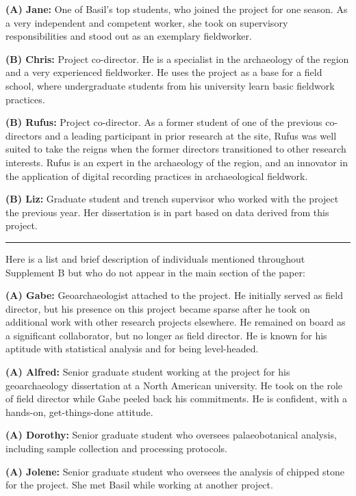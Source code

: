 \documentclass[
]{article}
\begin{document}
\textbf{(A) Jane:} One of Basil's top students, who joined the project
for one season. As a very independent and competent worker, she took on
supervisory responsibilities and stood out as an exemplary fieldworker.

\textbf{(B) Chris:} Project co-director. He is a specialist in the
archaeology of the region and a very experienced fieldworker. He uses
the project as a base for a field school, where undergraduate students
from his university learn basic fieldwork practices.

\textbf{(B) Rufus:} Project co-director. As a former student of one of
the previous co-directors and a leading participant in prior research at
the site, Rufus was well suited to take the reigns when the former
directors transitioned to other research interests. Rufus is an expert
in the archaeology of the region, and an innovator in the application of
digital recording practices in archaeological fieldwork.

\textbf{(B) Liz:} Graduate student and trench supervisor who worked with
the project the previous year. Her dissertation is in part based on data
derived from this project.

\begin{center}\rule{0.5\linewidth}{0.5pt}\end{center}

Here is a list and brief description of individuals mentioned throughout
Supplement B but who do not appear in the main section of the paper:

\textbf{(A) Gabe:} Geoarchaeologist attached to the project. He
initially served as field director, but his presence on this project
became sparse after he took on additional work with other research
projects elsewhere. He remained on board as a significant collaborator,
but no longer as field director. He is known for his aptitude with
statistical analysis and for being level-headed.

\textbf{(A) Alfred:} Senior graduate student working at the project for
his geoarchaeology dissertation at a North American university. He took
on the role of field director while Gabe peeled back his commitments. He
is confident, with a hands-on, get-things-done attitude.

\textbf{(A) Dorothy:} Senior graduate student who oversees
palaeobotanical analysis, including sample collection and processing
protocols.

\textbf{(A) Jolene:} Senior graduate student who oversees the analysis
of chipped stone for the project. She met Basil while working at another
project.
\end{document}
